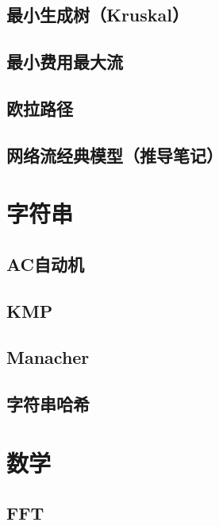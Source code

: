 \documentclass[11pt,a4paper]{ctexart}
\begin{document}
\subsection{最小生成树（Kruskal）}


\subsection{最小费用最大流}


\subsection{欧拉路径}


\subsection{网络流经典模型（推导笔记）}


\section{字符串}
\subsection{AC自动机}


\subsection{KMP}


\subsection{Manacher}


\subsection{字符串哈希}


\section{数学}
\subsection{FFT}

\end{document}
